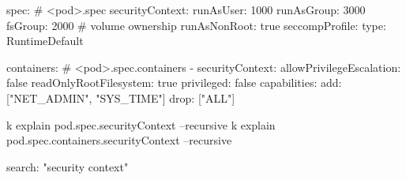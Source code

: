 \begin{tcbitemize}[
  raster columns=3, raster equal height=rows,
  blanker, cheat subtitle
]
\begin{tcbitemize}[
      raster columns=2, raster equal height=rows,
      blanker, cheat subtitle
]
      \tcbitem
        \begin{cheatcodebash}
        spec:                 # <pod>.spec
          securityContext:
            runAsUser: 1000
            runAsGroup: 3000
            fsGroup: 2000     # volume ownership
            runAsNonRoot: true
            seccompProfile:
              type: RuntimeDefault
        \end{cheatcodebash}

        \begin{cheatcodebash}
          containers:         # <pod>.spec.containers
          - securityContext:
              allowPrivilegeEscalation: false
              readOnlyRootFilesystem: true
              privileged: false
              capabilities:
                add: ["NET_ADMIN", "SYS_TIME"]
                drop: ["ALL"]
        \end{cheatcodebash}


        \begin{cheatcodebash}
        k explain pod.spec.securityContext --recursive
        k explain pod.spec.containers.securityContext --recursive
        \end{cheatcodebash}

        \begin{cheatcodebash}
        search: "security context"
        \end{cheatcodebash}


\end{tcbitemize}
\end{tcbitemize}
